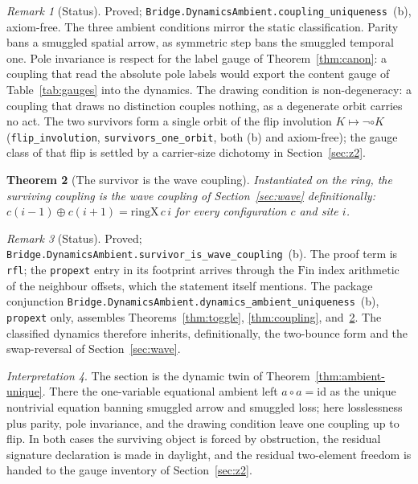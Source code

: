 \documentclass[11pt,a4paper]{article}
\theoremstyle{plain}
\newtheorem{theorem}{Theorem}[section]
\theoremstyle{definition}
\theoremstyle{remark}
\newtheorem{remark}[theorem]{Remark}
\newtheorem{interpretation}[theorem]{Interpretation}
\newcommand{\comp}{\circ}
\begin{document}
\begin{remark}[Status]
Proved; \texttt{Bridge.DynamicsAmbient.coupling\_uniqueness}~(b),
axiom-free. The three ambient conditions mirror the static
classification. Parity bans a smuggled spatial arrow, as symmetric
step bans the smuggled temporal one. Pole invariance is respect for
the label gauge of Theorem~\ref{thm:canon}: a coupling that read the
absolute pole labels would export the content gauge of
Table~\ref{tab:gauges} into the dynamics. The drawing condition is
non-degeneracy: a coupling that draws no distinction couples nothing,
as a degenerate orbit carries no act. The two survivors form a single
orbit of the flip involution $K\mapsto\neg\comp K$
(\texttt{flip\_involution}, \texttt{survivors\_one\_orbit}, both (b)
and axiom-free); the gauge class of that flip is settled by a
carrier-size dichotomy in Section~\ref{sec:z2}.
\end{remark}

\begin{theorem}[The survivor is the wave coupling]
\label{thm:survivor}
Instantiated on the ring, the surviving coupling is the wave coupling
of Section~\ref{sec:wave} definitionally:
$c(i-1)\oplus c(i+1) = \mathrm{ringX}\,c\,i$ for every configuration
$c$ and site $i$.
\end{theorem}

\begin{remark}[Status]
Proved; \texttt{Bridge.DynamicsAmbient.survivor\_is\_wave\_coupling}~(b).
The proof term is \texttt{rfl}; the \texttt{propext} entry in its
footprint arrives through the $\mathrm{Fin}$ index arithmetic of the
neighbour offsets, which the statement itself mentions. The package
conjunction
\texttt{Bridge.DynamicsAmbient.dynamics\_ambient\_uniqueness}~(b),
\texttt{propext} only, assembles Theorems~\ref{thm:toggle},
\ref{thm:coupling}, and~\ref{thm:survivor}. The classified dynamics
therefore inherits, definitionally, the two-bounce form and the
swap-reversal of Section~\ref{sec:wave}.
\end{remark}

\begin{interpretation}
\label{int:twin}
The section is the dynamic twin of Theorem~\ref{thm:ambient-unique}.
There the one-variable equational ambient left $a\comp a=\mathrm{id}$
as the unique nontrivial equation banning smuggled arrow and smuggled
loss; here losslessness plus parity, pole invariance, and the drawing
condition leave one coupling up to flip. In both cases the surviving
object is forced by obstruction, the residual signature declaration is
made in daylight, and the residual two-element freedom is handed to
the gauge inventory of Section~\ref{sec:z2}.
\end{interpretation}
\end{document}
